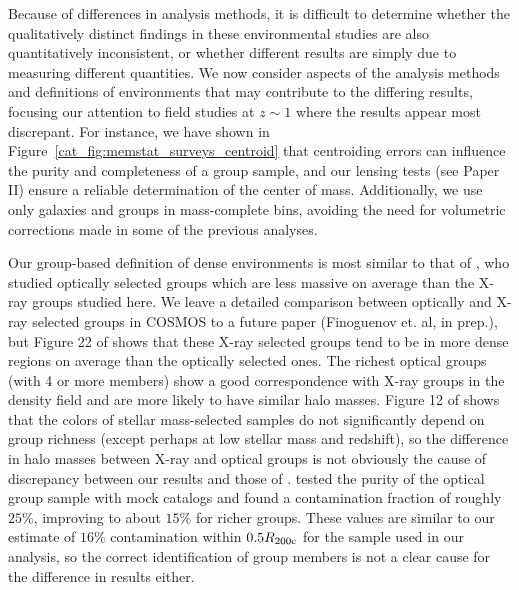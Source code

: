 Because of differences in analysis methods, it is difficult to
determine whether the qualitatively distinct findings in these
environmental studies are also quantitatively inconsistent, or whether
different results are simply due to measuring different quantities.
We now consider aspects of the analysis methods and
definitions of environments that may contribute
to the differing results, focusing our attention to field studies at $z\sim
1$ where the results appear most discrepant. For instance, we have shown in
Figure~\ref{cat_fig:memstat_surveys_centroid} that centroiding errors can
influence the purity and completeness of a 
group sample, and our lensing tests (see Paper II) ensure a reliable
determination of the center of mass. Additionally, we use only galaxies and groups in
mass-complete bins, avoiding the need for volumetric corrections made
in some of the previous analyses.

Our group-based definition of 
dense environments is most similar to that of \citet{Iovino2010}, who
studied optically selected groups which are less massive on average
than the X-ray groups studied here. We leave a detailed comparison
between optically and X-ray selected groups in COSMOS to a
future paper (Finoguenov et. al, in prep.), but Figure 22 of \citet{Kovac2010a}
shows that these X-ray selected groups tend to be in more dense regions
on average than the optically selected ones. The richest optical
groups (with 4 or more members) show a good correspondence with X-ray
groups in the density field and are more likely to have similar halo
masses. Figure 12 of \citet{Iovino2010} shows that the colors of
stellar mass-selected samples do not significantly depend on group
richness (except perhaps at low stellar mass and redshift), so the
difference in halo masses between X-ray and optical groups is not
obviously the cause of discrepancy between our results and those of
\citet{Iovino2010}. \citet{Knobel2009} tested the purity of the
optical group sample with mock catalogs and found a contamination
fraction of roughly $25\%$, improving to about $15\%$ for richer
groups. These values are similar to our estimate of $16\%$
contamination within $0.5\mbox{$R_{200\rm{c}}$}$ for the sample used in our analysis,
so the correct identification of group members is not a clear cause for
the difference in results either.

